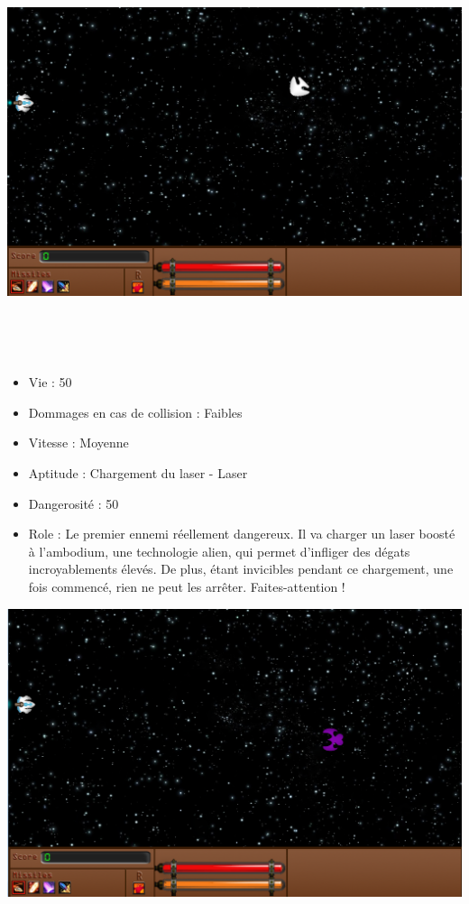 \includegraphics{images/vaisseaux/zebra.png}
				\par~
				\item[$\bullet$ Battle Cruiser]
				\par~
				\begin{itemize}
					\item Vie : 50
					\item Dommages en cas de collision : Faibles
					\item Vitesse : Moyenne
					\item Aptitude : Chargement du laser - Laser
					\item Dangerosité : 50%
					\item Role : Le premier ennemi réellement dangereux. Il va charger un laser boosté à l'ambodium, une technologie alien, qui permet d'infliger des dégats incroyablements élevés. De plus, étant invicibles pendant ce chargement, une fois commencé, rien ne peut les arrêter. Faites-attention !
				\end{itemize}
\includegraphics{images/vaisseaux/bc_load.png}
